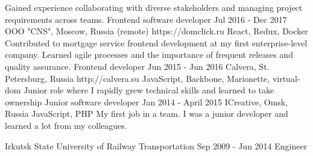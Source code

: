 \documentclass[11pt,a4paper,sans]{awesomecv}
\begin{document}
\begin{cventries}
{{          Gained experience collaborating with diverse stakeholders and managing project requirements across teams.
          \hfill \break
          \hfill \break
        }
    }
\cventry
    {Frontend software developer}
    {Jul 2016 - Dec 2017}
    {OOO "CNS", Moscow, Russia (remote)}
    {https://domclick.ru}
    {
      \cvproject
        {}{}{}
        {React, Redux, Docker}
        {
          Contributed to mortgage service frontend development at my first enterprise-level company. 
          Learned agile processes and the importance of frequent releases and quality assurance.
          \hfill \break
        }
    }
\cventry
    {Frontend developer}
    {Jun 2015 - Jun 2016}
    {Calvera, St. Petersburg, Russia}
    {http://calvera.su}
    {
      \cvproject
        {}{}{}
        {JavaScript, Backbone, Marionette, virtual-dom}
        {
          Junior role where I rapidly grew technical skills and learned to take ownership
          \hfill \break
        }
    }
\cventry
    {Junior software developer}
    {Jan 2014 - April 2015}
    {ICreative, Omsk, Russia}{}
    {
      \cvproject
        {}{}{}
        {JavaScript, PHP}
        {
          My first job in a team. I was a junior developer and learned a lot from my colleagues.
          \hfill \break
        }
    }
\end{cventries}

\begin{cventries}
\cventry
    {Irkutsk State University of Railway Transportation}
    {Sep 2009 - Jun 2014}
    {Engineer}
    {}
    {}
\end{cventries}
\end{document}
